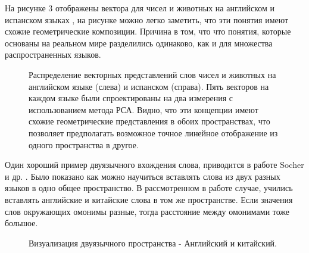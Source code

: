 \documentclass[12pt]{article}
\begin{document}
На рисунке 3 отображены вектора для чисел и животных на английском и испанском языках \cite{Le}, на рисунке можно легко заметить, что эти понятия имеют схожие геометрические композиции. Причина в том, что что понятия, которые основаны на реальном мире разделились одинаково, как и для множества распространенных языков.
	\begin{figure}[H]
		\noindent{}
		\caption{Распределение векторных представлений слов чисел и животных на английском языке (слева) и испанском (справа). Пять векторов на каждом языке
были спроектированы на два измерения с использованием метода РСА. Видно, что эти концепции имеют схожие геометрические представления в обоих пространствах,
 что позволяет предполагать возможное точное линейное отображение из одного пространства в другое.}
		\label{figCurves}
	\end{figure}

Один хороший пример двуязычного вхождения слова, приводится в работе Socher и др. \cite{Zou}. Было показано как можно научиться вставлять слова из двух разных языков в одно общее пространство. В рассмотренном в работе случае, учились вставлять английские и китайские слова в том же пространстве. Если значения слов окружающих омонимы разные, тогда расстояние между омонимами тоже большое.

 	\begin{figure}[H]
		\noindent{}
		\caption{Визуализация двуязычного пространства - Английский и китайский.}
		\label{figCurves}
	\end{figure}
\end{document}
